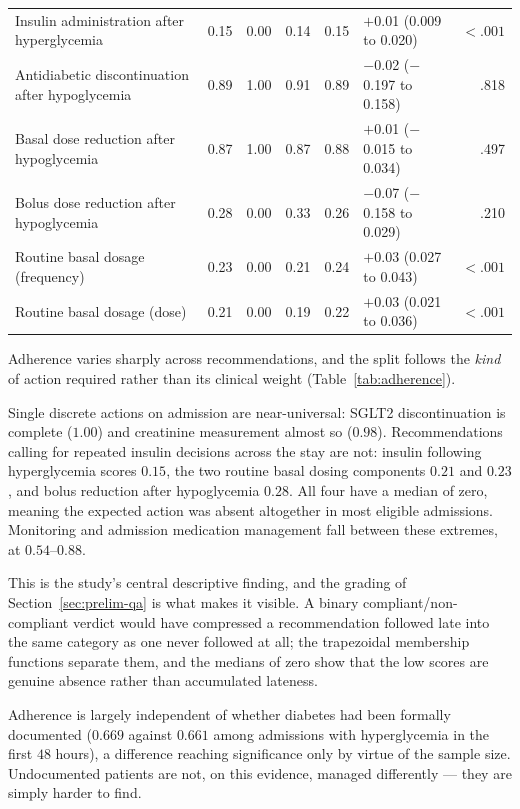 \begin{longtable}{>{\raggedright\arraybackslash}p{}rrrrlr}
Insulin administration after hyperglycemia
  & 0.15 & 0.00 & 0.14 & 0.15 & $+$0.01 (0.009 to 0.020) & $<.001$ \\
Antidiabetic discontinuation after hypoglycemia
  & 0.89 & 1.00 & 0.91 & 0.89 & $-$0.02 ($-$0.197 to 0.158) & .818 \\
Basal dose reduction after hypoglycemia
  & 0.87 & 1.00 & 0.87 & 0.88 & $+$0.01 ($-$0.015 to 0.034) & .497 \\
Bolus dose reduction after hypoglycemia
  & 0.28 & 0.00 & 0.33 & 0.26 & $-$0.07 ($-$0.158 to 0.029) & .210 \\
Routine basal dosage (frequency)
  & 0.23 & 0.00 & 0.21 & 0.24 & $+$0.03 (0.027 to 0.043) & $<.001$ \\
Routine basal dosage (dose)
  & 0.21 & 0.00 & 0.19 & 0.22 & $+$0.03 (0.021 to 0.036) & $<.001$ \\
\end{longtable}
\endgroup

Adherence varies sharply across recommendations, and the split follows the \emph{kind} of action required rather than its clinical weight (Table~\ref{tab:adherence}).

Single discrete actions on admission are near-universal: SGLT2 discontinuation is complete ($1.00$) and creatinine measurement almost so ($0.98$). Recommendations calling for repeated insulin decisions across the stay are not: insulin following hyperglycemia scores $0.15$, the two routine basal dosing components $0.21$ and $0.23$, and bolus reduction after hypoglycemia $0.28$. All four have a median of zero, meaning the expected action was absent altogether in most eligible admissions. Monitoring and admission medication management fall between these extremes, at $0.54$--$0.88$.

This is the study's central descriptive finding, and the grading of Section~\ref{sec:prelim-qa} is what makes it visible. A binary compliant/non-compliant verdict would have compressed a recommendation followed late into the same category as one never followed at all; the trapezoidal membership functions separate them, and the medians of zero show that the low scores are genuine absence rather than accumulated lateness.

Adherence is largely independent of whether diabetes had been formally documented ($0.669$ against $0.661$ among admissions with hyperglycemia in the first $48$ hours), a difference reaching significance only by virtue of the sample size. Undocumented patients are not, on this evidence, managed differently --- they are simply harder to find.

